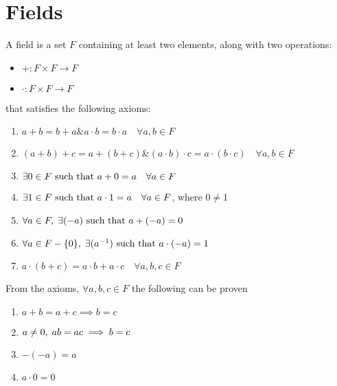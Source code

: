 \section{Fields}

A field is a set $F$ containing at least two elements, along with two operations:

\begin{itemize}
    \item $+: F \times F \to F$
    \item $\cdot: F \times F \to F$
\end{itemize}

that satisfies the following axioms:

\begin{enumerate}
    \item $a + b = b + a \& a \cdot b = b \cdot a \quad \forall a, b \in F$
    \item $(a + b) + c = a + (b + c) \& (a \cdot b) \cdot c = a \cdot (b \cdot c) \quad \forall a, b \in F$
    \item $\exists 0 \in F \text{ such that } a + 0 = a \quad \forall a \in F$
    \item $\exists 1 \in F \text{ such that } a \cdot 1 = a \quad \forall a \in F$, where $0 \not = 1$
    \item $\forall a \in F ,\; \exists (-a) \text{ such that } a + (-a) = 0$
    \item $\forall a \in F - \{0\} ,\; \exists (a^{-1}) \text{ such that } a \cdot (-a) = 1$
    \item $a \cdot (b + c) = a \cdot b + a \cdot c \quad \forall a, b, c \in F$
\end{enumerate}



From the axioms, $\forall a, b, c \in F$ the following can be proven

\begin{enumerate}
    \item $a + b = a + c \implies b = c$
    \item $a \not = 0 ,\; ab = ac \implies b = c$
    \item $-(-a) = a$
    \item $a \cdot 0 = 0$
\end{enumerate}
